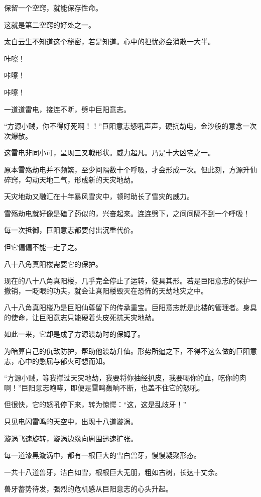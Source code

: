 \begin{this_body}
保留一个空窍，就能保存性命。

这就是第二空窍的好处之一。

太白云生不知道这个秘密，若是知道。心中的担忧必会消散一大半。

咔嚓！

咔嚓！

咔嚓！

一道道雷电，接连不断，劈中巨阳意志。

“方源小贼，你不得好死啊！！”巨阳意志怒吼声声，硬抗劫电，金沙般的意念一次次爆散。

这雷电非同小可，呈现三叉戟形状。威力超凡。乃是十大凶宅之一。

原本雪殇劫电并不频繁，至少间隔数十个呼吸，才会形成一次。但此刻，方源升仙碎窍，勾动天地二气，形成新的天灾地劫。

天灾地劫又融汇在十年暴风雪灾中，顿时助长了雪灾的威力。

雪殇劫电就好像是磕了药似的，兴奋起来。连连劈下，之间间隔不到一个呼吸！

每一次抵御，巨阳意志都要付出沉重代价。

但它偏偏不能一走了之。

八十八角真阳楼需要它的保护。

现在的八十八角真阳楼，几乎完全停止了运转，徒具其形。若是巨阳意志的保护一撤销，一眨眼的功夫，就会让真阳楼毁灭在恐怖的天劫地灾之中。

八十八角真阳楼乃是巨阳仙尊留下的传承重宝。巨阳意志就是此楼的管理者。身具的使命，让巨阳意志只能硬着头皮死抗天灾地劫。

如此一来，它却是成了方源渡劫时的保姆了。

为暗算自己的仇敌防护，帮助他渡劫升仙。形势所逼之下，不得不这么做的巨阳意志，心中的憋屈与郁火可想而知。

“方源小贼，等我撑过天灾地劫，我要将你抽经扒皮，我要喝你的血，吃你的肉啊！”巨阳意志咆哮，即便是雷鸣轰响不断，也盖不住它的怒吼。

但很快，它的怒吼停下来，转为惊愕：“这，这是乱歧牙！”

只见电闪雷鸣的天空中，出现十八道漩涡。

漩涡飞速旋转，漩涡边缘向周围迅速扩张。

每一道漆黑漩涡中，都有一根巨大的雪白兽牙，慢慢凝聚形态。

一共十八道兽牙，洁白如雪，根根巨大无朋，粗如古树，长达十丈余。

兽牙蓄势待发，强烈的危机感从巨阳意志的心头升起。


\end{this_body}
